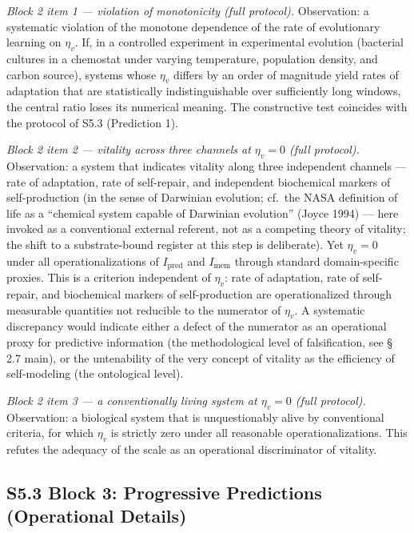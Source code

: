 \documentclass[pdflatex,sn-mathphys-ay]{sn-jnl}
\begin{document}
\emph{Block 2 item 1 --- violation of monotonicity (full protocol).} Observation: a systematic violation of the monotone dependence of the rate of evolutionary learning on \(\eta_v\). If, in a controlled experiment in experimental evolution (bacterial cultures in a chemostat under varying temperature, population density, and carbon source), systems whose \(\eta_v\) differs by an order of magnitude yield rates of adaptation that are statistically indistinguishable over sufficiently long windows, the central ratio loses its numerical meaning. The constructive test coincides with the protocol of S5.3 (Prediction 1).

\emph{Block 2 item 2 --- vitality across three channels at \(\eta_v = 0\) (full protocol).} Observation: a system that indicates vitality along three independent channels --- rate of adaptation, rate of self-repair, and independent biochemical markers of self-production (in the sense of Darwinian evolution; cf.~the NASA definition of life as a ``chemical system capable of Darwinian evolution'' (Joyce 1994) --- here invoked as a conventional external referent, not as a competing theory of vitality; the shift to a substrate-bound register at this step is deliberate). Yet \(\eta_v = 0\) under all operationalizations of \(I_{\text{pred}}\) and \(I_{\text{mem}}\) through standard domain-specific proxies. This is a criterion independent of \(\eta_v\): rate of adaptation, rate of self-repair, and biochemical markers of self-production are operationalized through measurable quantities not reducible to the numerator of \(\eta_v\). A systematic discrepancy would indicate either a defect of the numerator as an operational proxy for predictive information (the methodological level of falsification, see § 2.7 main), or the untenability of the very concept of vitality as the efficiency of self-modeling (the ontological level).

\emph{Block 2 item 3 --- a conventionally living system at \(\eta_v = 0\) (full protocol).} Observation: a biological system that is unquestionably alive by conventional criteria, for which \(\eta_v\) is strictly zero under all reasonable operationalizations. This refutes the adequacy of the scale as an operational discriminator of vitality.

\subsection*{S5.3 Block 3: Progressive Predictions (Operational Details)}\label{s5.3-block-3-progressive-predictions-operational-details}
\end{document}
